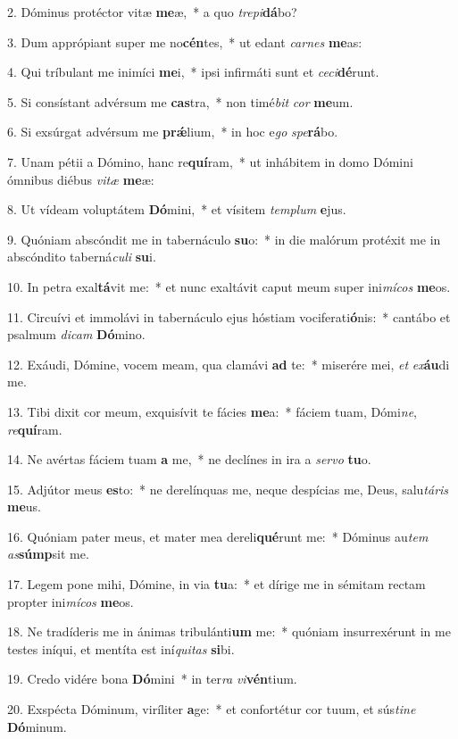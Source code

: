 2. Dóminus protéctor vitæ \textbf{me}æ,~*  a quo \textit{tre}\textit{pi}\textbf{dá}bo?\

3. Dum apprópiant super me no\textbf{cén}tes,~*  ut edant \textit{car}\textit{nes} \textbf{me}as:\

4. Qui tríbulant me inimíci \textbf{me}i,~*  ipsi infirmáti sunt et \textit{ce}\textit{ci}\textbf{dé}runt.\

5. Si consístant advérsum me \textbf{cas}tra,~*  non timé\textit{bit} \textit{cor} \textbf{me}um.\

6. Si exsúrgat advérsum me \textbf{prǽ}lium,~*  in hoc e\textit{go} \textit{spe}\textbf{rá}bo.\

7. Unam pétii a Dómino, hanc re\textbf{quí}ram,~*  ut inhábitem in domo Dómini ómnibus diébus \textit{vi}\textit{tæ} \textbf{me}æ:\

8. Ut vídeam voluptátem \textbf{Dó}mini,~*  et vísitem \textit{tem}\textit{plum} \textbf{e}jus.\

9. Quóniam abscóndit me in tabernáculo \textbf{su}o:~*  in die malórum protéxit me in abscóndito taberná\textit{cu}\textit{li} \textbf{su}i.\

10. In petra exal\textbf{tá}vit me:~*  et nunc exaltávit caput meum super ini\textit{mí}\textit{cos} \textbf{me}os.\

11. Circuívi et immolávi in tabernáculo ejus hóstiam vociferati\textbf{ó}nis:~*  cantábo et psalmum \textit{di}\textit{cam} \textbf{Dó}mino.\

12. Exáudi, Dómine, vocem meam, qua clamávi \textbf{ad} te:~*  miserére mei, \textit{et} \textit{ex}\textbf{áu}di me.\

13. Tibi dixit cor meum, exquisívit te fácies \textbf{me}a:~*  fáciem tuam, Dómi\textit{ne}, \textit{re}\textbf{quí}ram.\

14. Ne avértas fáciem tuam \textbf{a} me,~*  ne declínes in ira a \textit{ser}\textit{vo} \textbf{tu}o.\

15. Adjútor meus \textbf{es}to:~*  ne derelínquas me, neque despícias me, Deus, salu\textit{tá}\textit{ris} \textbf{me}us.\

16. Quóniam pater meus, et mater mea dereli\textbf{qué}runt me:~*  Dóminus au\textit{tem} \textit{as}\textbf{súmp}sit me.\

17. Legem pone mihi, Dómine, in via \textbf{tu}a:~*  et dírige me in sémitam rectam propter ini\textit{mí}\textit{cos} \textbf{me}os.\

18. Ne tradíderis me in ánimas tribulánti\textbf{um} me:~*  quóniam insurrexérunt in me testes iníqui, et mentíta est iní\textit{qui}\textit{tas} \textbf{si}bi.\

19. Credo vidére bona \textbf{Dó}mini~*  in ter\textit{ra} \textit{vi}\textbf{vén}tium.\

20. Exspécta Dóminum, viríliter \textbf{a}ge:~*  et confortétur cor tuum, et sús\textit{ti}\textit{ne} \textbf{Dó}minum.\

